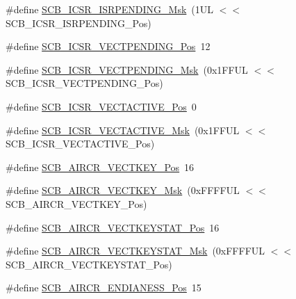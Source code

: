 \begin{DoxyCompactItemize}
\item 
\#define \mbox{\hyperlink{group___c_m_s_i_s___s_c_b_ga056d74fd538e5d36d3be1f28d399c877}{S\+C\+B\+\_\+\+I\+C\+S\+R\+\_\+\+I\+S\+R\+P\+E\+N\+D\+I\+N\+G\+\_\+\+Msk}}~(1\+U\+L $<$$<$ S\+C\+B\+\_\+\+I\+C\+S\+R\+\_\+\+I\+S\+R\+P\+E\+N\+D\+I\+N\+G\+\_\+\+Pos)
\item 
\#define \mbox{\hyperlink{group___c_m_s_i_s___s_c_b_gada60c92bf88d6fd21a8f49efa4a127b8}{S\+C\+B\+\_\+\+I\+C\+S\+R\+\_\+\+V\+E\+C\+T\+P\+E\+N\+D\+I\+N\+G\+\_\+\+Pos}}~12
\item 
\#define \mbox{\hyperlink{group___c_m_s_i_s___s_c_b_gacb6992e7c7ddc27a370f62878a21ef72}{S\+C\+B\+\_\+\+I\+C\+S\+R\+\_\+\+V\+E\+C\+T\+P\+E\+N\+D\+I\+N\+G\+\_\+\+Msk}}~(0x1\+F\+F\+U\+L $<$$<$ S\+C\+B\+\_\+\+I\+C\+S\+R\+\_\+\+V\+E\+C\+T\+P\+E\+N\+D\+I\+N\+G\+\_\+\+Pos)
\item 
\#define \mbox{\hyperlink{group___c_m_s_i_s___s_c_b_gae4f602c7c5c895d5fb687b71b0979fc3}{S\+C\+B\+\_\+\+I\+C\+S\+R\+\_\+\+V\+E\+C\+T\+A\+C\+T\+I\+V\+E\+\_\+\+Pos}}~0
\item 
\#define \mbox{\hyperlink{group___c_m_s_i_s___s_c_b_ga5533791a4ecf1b9301c883047b3e8396}{S\+C\+B\+\_\+\+I\+C\+S\+R\+\_\+\+V\+E\+C\+T\+A\+C\+T\+I\+V\+E\+\_\+\+Msk}}~(0x1\+F\+F\+U\+L $<$$<$ S\+C\+B\+\_\+\+I\+C\+S\+R\+\_\+\+V\+E\+C\+T\+A\+C\+T\+I\+V\+E\+\_\+\+Pos)
\item 
\#define \mbox{\hyperlink{group___c_m_s_i_s___s_c_b_gaaa27c0ba600bf82c3da08c748845b640}{S\+C\+B\+\_\+\+A\+I\+R\+C\+R\+\_\+\+V\+E\+C\+T\+K\+E\+Y\+\_\+\+Pos}}~16
\item 
\#define \mbox{\hyperlink{group___c_m_s_i_s___s_c_b_ga90c7cf0c490e7ae55f9503a7fda1dd22}{S\+C\+B\+\_\+\+A\+I\+R\+C\+R\+\_\+\+V\+E\+C\+T\+K\+E\+Y\+\_\+\+Msk}}~(0x\+F\+F\+F\+F\+U\+L $<$$<$ S\+C\+B\+\_\+\+A\+I\+R\+C\+R\+\_\+\+V\+E\+C\+T\+K\+E\+Y\+\_\+\+Pos)
\item 
\#define \mbox{\hyperlink{group___c_m_s_i_s___s_c_b_gaec404750ff5ca07f499a3c06b62051ef}{S\+C\+B\+\_\+\+A\+I\+R\+C\+R\+\_\+\+V\+E\+C\+T\+K\+E\+Y\+S\+T\+A\+T\+\_\+\+Pos}}~16
\item 
\#define \mbox{\hyperlink{group___c_m_s_i_s___s_c_b_gabacedaefeefc73d666bbe59ece904493}{S\+C\+B\+\_\+\+A\+I\+R\+C\+R\+\_\+\+V\+E\+C\+T\+K\+E\+Y\+S\+T\+A\+T\+\_\+\+Msk}}~(0x\+F\+F\+F\+F\+U\+L $<$$<$ S\+C\+B\+\_\+\+A\+I\+R\+C\+R\+\_\+\+V\+E\+C\+T\+K\+E\+Y\+S\+T\+A\+T\+\_\+\+Pos)
\item 
\#define \mbox{\hyperlink{group___c_m_s_i_s___s_c_b_gad31dec98fbc0d33ace63cb1f1a927923}{S\+C\+B\+\_\+\+A\+I\+R\+C\+R\+\_\+\+E\+N\+D\+I\+A\+N\+E\+S\+S\+\_\+\+Pos}}~15
$$
\end{DoxyCompactItemize}
